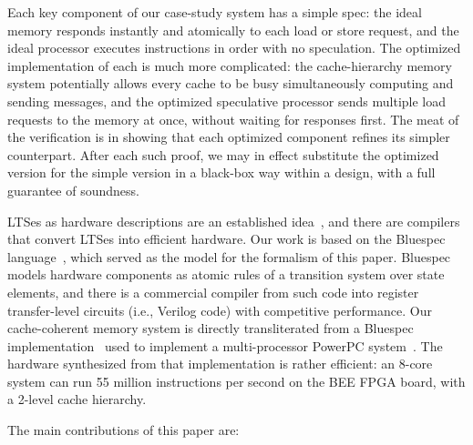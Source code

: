 Each key component of our case-study system has a simple spec: the
ideal memory responds instantly and atomically to each load or store
request, and the ideal processor executes instructions in order with
no speculation.  The optimized implementation of each is much more
complicated: the cache-hierarchy memory system potentially allows
every cache to be busy simultaneously computing and sending messages,
and the optimized speculative processor sends multiple load requests
to the memory at once, without waiting for responses first.  The meat
of the verification is in showing that each optimized component
refines its simpler counterpart.  After each such proof, we may in
effect substitute the optimized version for the simple version in a
black-box way within a design, with a full guarantee of soundness.

LTSes as hardware descriptions are an established
idea~\cite{HoeArvind:TRSSynthesis1, Hoe:TCAD}, and there are
compilers that convert LTSes into efficient hardware.  Our work is
based on the Bluespec language~\cite{BSV:LangRef, Bluespec:TFRG},
which served as the model for the formalism of this paper.  Bluespec
models hardware components as atomic rules of a transition system over
state elements, and there is a commercial compiler from such code into
register transfer-level circuits (i.e., Verilog code) with competitive
performance.  Our cache-coherent memory system is directly
transliterated from a Bluespec
implementation~\cite{DNA:CoherenceImplementation} used to
implement a multi-processor PowerPC system~\cite{Khan:PowerPc}. The
hardware synthesized from that implementation is rather efficient:
an 8-core system can run 55 million instructions per second on
the BEE FPGA board\cite{}, with a 2-level cache hierarchy.

The main contributions of this paper are:

